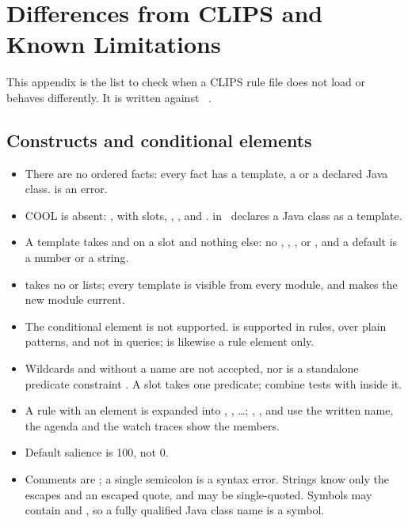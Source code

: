 \chapter{Differences from CLIPS and Known Limitations}
\label{app:differences}

This appendix is the list to check when a CLIPS rule file does not load
or behaves differently. It is written against \Morendo\ \version.

\section{Constructs and conditional elements}

\begin{itemize}
\item There are no ordered facts: every fact has a template, a
   or a declared Java class. 
  is an error.
\item COOL is absent: ,  with slots,
  , ,  and .
   in \Morendo\ declares a Java class as a template.
\item A template takes  and  on a slot and nothing
  else: no , , ,
   or , and a default is a number or
  a string.
\item {} takes no  or  lists; every
  template is visible from every module, and  makes the
  new module current.
\item The  conditional element is not supported.
   is supported in rules, over plain patterns, and not in
  queries;  is likewise a rule element only.
\item Wildcards  and  without a name are not accepted, nor
  is a standalone predicate constraint . A slot takes one
  predicate; combine tests with  inside it.
\item A rule with an  element is expanded into ,
  , \dots; , ,  and
   use the written name, the agenda and the watch traces show
  the members.
\item Default salience is 100, not 0.
\item Comments are \fn{;;}; a single semicolon is a syntax error. Strings
  know only the escapes \fn{\textbackslash\textbackslash} and an escaped
  quote, and may be single-quoted. Symbols may contain  and
  \fn{/}, so a fully qualified Java class name is a symbol.
\end{itemize}

